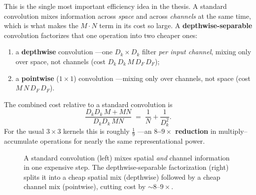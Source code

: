 This is the single most important efficiency idea in the thesis. A standard convolution mixes
information across \emph{space} and across \emph{channels} at the same time, which is what makes the
$M\cdot N$ term in its cost so large. A \textbf{depthwise-separable} convolution factorizes that one
operation into two cheaper ones:
\begin{enumerate}[leftmargin=1.6em,nosep]
  \item a \textbf{depthwise} convolution ---one $D_k\times D_k$ filter \emph{per input channel},
  mixing only over space, not channels (cost $D_k\,D_k\,M\,D_F\,D_F$);
  \item a \textbf{pointwise} ($1\times1$) convolution ---mixing only over channels, not space (cost
  $M\,N\,D_F\,D_F$).
\end{enumerate}
The combined cost relative to a standard convolution is
\[
  \frac{D_k D_k\,M + M N}{D_k D_k\,M N} \;=\; \frac{1}{N} + \frac{1}{D_k^{2}} .
\]
For the usual $3\times3$ kernels this is roughly $\tfrac19$ ---an \textbf{$8$--$9\times$ reduction} in
multiply--accumulate operations for nearly the same representational power.

\begin{figure}[H]
\centering
{}
\caption{A standard convolution (left) mixes spatial \emph{and} channel information in one expensive
step. The depthwise-separable factorization (right) splits it into a cheap spatial mix (depthwise)
followed by a cheap channel mix (pointwise), cutting cost by $\sim$$8$--$9\times$.}
\label{fig:blocks:dwsep}
\end{figure}

